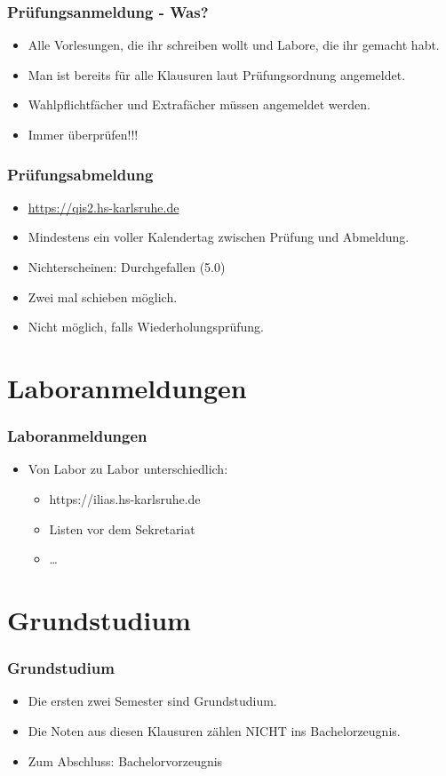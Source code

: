 \documentclass[final]{beamer}
\begin{document}
\begin{frame}
\frametitle{Prüfungsanmeldung - Was?}
\begin{itemize}
	\item Alle Vorlesungen, die ihr schreiben wollt und Labore, die ihr gemacht habt.
	\item Man ist bereits für alle Klausuren laut Prüfungsordnung angemeldet.
	\item Wahlpflichtfächer und Extrafächer müssen angemeldet werden.
	\item Immer überprüfen!!!
\end{itemize}
\end{frame}

\begin{frame}
\frametitle{Prüfungsabmeldung}
\begin{itemize}
\item \url{https://qis2.hs-karlsruhe.de}
\item Mindestens ein voller Kalendertag zwischen Prüfung und Abmeldung.
\item Nichterscheinen: Durchgefallen (5.0)
\item Zwei mal schieben möglich.
\item Nicht möglich, falls Wiederholungsprüfung.
\end{itemize}
\end{frame}

\section{Laboranmeldungen}
\begin{frame}
\frametitle{Laboranmeldungen}
	\begin{itemize}
	\item Von Labor zu Labor unterschiedlich:
		\begin{itemize}
		\item https://ilias.hs-karlsruhe.de
		\item Listen vor dem Sekretariat
		\item …
		\end{itemize}
	\end{itemize}
\end{frame}

\section{Grundstudium}
\begin{frame}
\frametitle{Grundstudium}
\begin{itemize}
	\item Die ersten zwei Semester sind Grundstudium.
	\item Die Noten aus diesen Klausuren zählen NICHT ins Bachelorzeugnis.
	\item Zum Abschluss: Bachelorvorzeugnis
\end{itemize}
\end{frame}
\end{document}
